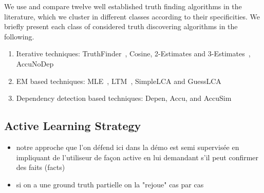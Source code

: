 We use and compare twelve well established truth finding algorithms in the literature,
which we cluster in different classes according to their specificities.
We briefly present each class of considered truth discovering algorithms in the following.

\begin{enumerate}
 \item Iterative techniques: TruthFinder~\cite{YinHY08}, Cosine, 2-Estimates and 3-Estimates~\cite{GallandAMS10}, 
 AccuNoDep~\cite{DongBS09}
 \item EM based techniques: MLE~\cite{WangKLA12}, LTM~\cite{ZhaoRGH12}, SimpleLCA and GuessLCA~\cite{PasternackR13}
 \item Dependency detection based techniques: Depen, Accu, and AccuSim~\cite{DongBS09}
\end{enumerate}



\subsection{Active Learning Strategy}
\begin{itemize}
 \item notre approche que l'on défend ici dans la démo est  semi supervisée en impliquant de l'utiliseur de façon active
en lui demandant s'il peut confirmer des faits (facts)
\item si on a une ground truth partielle on la "rejoue" cas par cas
\end{itemize}

